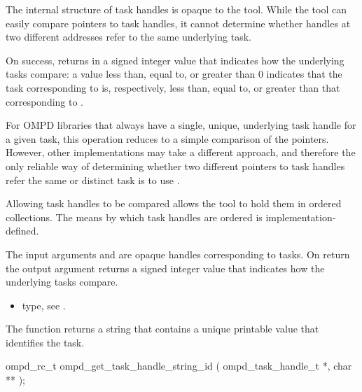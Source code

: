 \descr
The internal structure of task handles is opaque to the tool. While the tool can easily compare 
pointers to task handles, it cannot determine whether handles at two different addresses refer
to the same underlying task.

On success,  returns in  a signed integer 
value that indicates how the underlying tasks compare: a value less than, equal to, or greater than 
0 indicates that the task corresponding to  is, respectively, less than, equal 
to, or greater than that corresponding to .

For OMPD libraries that always have a single, unique, underlying task handle for a given 
task, this operation reduces to a simple comparison of the pointers. However, other 
implementations may take a different approach, and therefore the only reliable way of determining 
whether two different pointers to task handles refer the same or distinct task is to use 
.

Allowing task handles to be compared allows the tool to hold them in ordered collections.
The means by which task handles are ordered is implementation-defined.

\argdesc
The input arguments  and  are opaque handles 
corresponding to tasks.
On return the output argument   returns a signed 
integer value that indicates how the underlying tasks compare.

\crossreferences
\begin{itemize}
	\item {} type, see .
\end{itemize}

\label{subsubsubsec:ompd_get_task_handle_string_id}
\summary
The  function returns a string that contains a unique 
printable value that identifies the task.

\format

\begin{cspecific}
\begin{ompSyntax}
ompd_rc_t ompd_get_task_handle_string_id (
  ompd_task_handle_t *,
  char **
);
\end{ompSyntax}
\end{cspecific}


